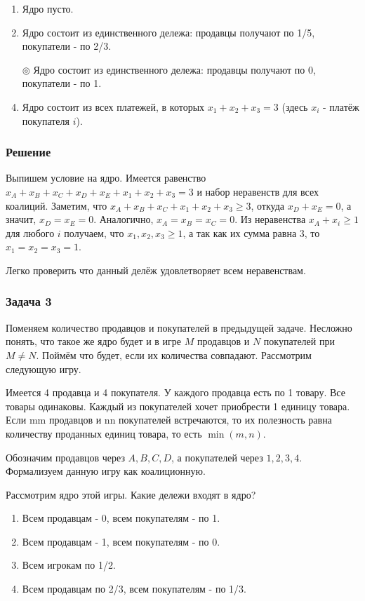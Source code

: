 	\begin{enumerate}[label=$\circ$]
		\item Ядро пусто.
		\item Ядро состоит из единственного дележа: продавцы получают по 1/5, покупатели - по 2/3.
		\item[$\circledcirc$] Ядро состоит из единственного дележа: продавцы получают по 0, покупатели - по 1.
		\item Ядро состоит из всех платежей, в которых $x_1+x_2+x_3 = 3$ (здесь $x_i$ - платёж покупателя $i$).
	\end{enumerate}

	\subsubsection*{Решение}
Выпишем условие на ядро. Имеется равенство $x_{A}+x_{B}+x_{C}+x_{D}+x_{E}+x_{1}+x_2+x_3=3$ и набор неравенств для всех коалиций. Заметим, что $x_A+x_B+x_C +x_1+x_2+x_3 \geq 3$, откуда $x_D+x_E=0$, а значит, $x_D=x_E=0$. Аналогично, $x_A=x_B=x_C=0$. Из неравенства $x_A+x_i\geq 1$ для любого $i$ получаем, что $x_1, x_2, x_3 \geq 1$, а так как их сумма равна 3, то $x_1=x_2=x_3=1$.

Легко проверить что данный делёж удовлетворяет всем неравенствам.
	
	\subsubsection{Задача 3}
	Поменяем количество продавцов и покупателей в предыдущей задаче. Несложно понять, что такое же ядро будет и в игре $M$ продавцов и $N$ покупателей при $M \neq N$. Поймём что будет, если их количества совпадают. Рассмотрим следующую игру.
	
	Имеется 4 продавца и 4 покупателя. У каждого продавца есть по 1 товару. Все товары одинаковы. Каждый из покупателей хочет приобрести 1 единицу товара. Если mm продавцов и nn покупателей встречаются, то их полезность равна количеству проданных единиц товара, то есть $\min(m,n)$.
	
	Обозначим продавцов через $A,B,C,D$, а покупателей через $1,2,3,4$. Формализуем данную игру как коалиционную.
	
	Рассмотрим ядро этой игры. Какие дележи входят в ядро?
	
	\begin{enumerate}[label=$\circledcirc$]
		\item Всем продавцам - 0, всем покупателям - по 1.
		\item Всем продавцам - 1, всем покупателям - по 0.
		\item Всем игрокам по 1/2.
		\item Всем продавцам по 2/3, всем покупателям - по 1/3.
	\end{enumerate}

